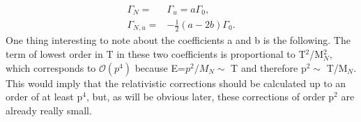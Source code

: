 \begin{align}
	\Gamma_N=&\Gamma_u=a\Gamma_0,\\
	\Gamma_{N,u}=&-\frac{1}{2}(a-2b)\Gamma_0.
\end{align}
One thing interesting to note about the coefficients a and b is the following. The term of lowest order in T in these two coefficients is proportional to T$^2$/M$_N^2$, which corresponds to $\mathcal{O}(p^4)$ because E=$p^2/M_N\sim$ T and therefore p$^2\sim$ T/M$_N$. This would imply that the relativistic corrections should be calculated up to an order of at least p$^4$, but, as will be obvious later, these corrections of order p$^2$ are already really small.
